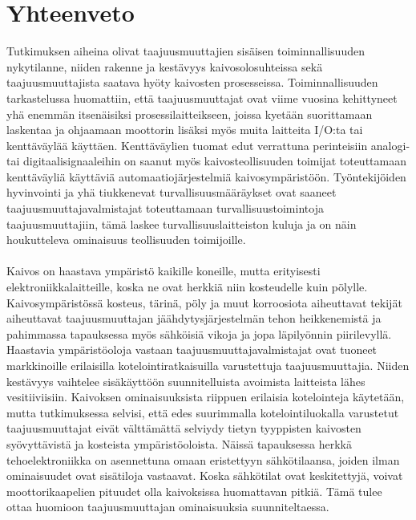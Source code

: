 \documentclass[finnish,12pt,a4paper,pdftex,elec,utf8]{aaltothesis}
\begin{document}
\section{Yhteenveto}
Tutkimuksen aiheina olivat taajuusmuuttajien sisäisen toiminnallisuuden nykytilanne, niiden rakenne ja kestävyys kaivosolosuhteissa sekä taajuusmuuttajista saatava hyöty kaivosten prosesseissa. Toiminnallisuuden tarkastelussa huomattiin, että taajuusmuuttajat ovat viime vuosina kehittyneet yhä enemmän itsenäisiksi prosessilaitteikseen, joissa kyetään suorittamaan laskentaa ja ohjaamaan moottorin lisäksi myös muita laitteita I/O:ta tai kenttäväylää käyttäen. Kenttäväylien tuomat edut verrattuna perinteisiin analogi- tai digitaalisignaaleihin on saanut myös kaivosteollisuuden toimijat toteuttamaan kenttäväyliä käyttäviä automaatiojärjestelmiä kaivosympäristöön. Työntekijöiden hyvinvointi ja yhä tiukkenevat turvallisuusmääräykset ovat saaneet taajuusmuuttajavalmistajat toteuttamaan turvallisuustoimintoja taajuusmuuttajiin, tämä laskee turvallisuuslaitteiston kuluja ja on näin houkutteleva ominaisuus teollisuuden toimijoille.
\\\\
Kaivos on haastava ympäristö kaikille koneille, mutta erityisesti elektroniikkalaitteille, koska ne ovat herkkiä niin kosteudelle kuin pölylle. Kaivosympäristössä kosteus, tärinä, pöly ja muut korroosiota aiheuttavat tekijät aiheuttavat taajuusmuuttajan jäähdytysjärjestelmän tehon heikkenemistä ja pahimmassa tapauksessa myös sähköisiä vikoja ja jopa läpilyönnin piirilevyllä. Haastavia ympäristöoloja vastaan taajuusmuuttajavalmistajat ovat tuoneet markkinoille erilaisilla kotelointiratkaisuilla varustettuja taajuusmuuttajia. Niiden kestävyys vaihtelee sisäkäyttöön suunnitelluista avoimista laitteista lähes vesitiiviisiin. Kaivoksen ominaisuuksista riippuen erilaisia kotelointeja käytetään, mutta tutkimuksessa selvisi, että edes suurimmalla kotelointiluokalla varustetut taajuusmuuttajat eivät välttämättä selviydy tietyn tyyppisten kaivosten syövyttävistä ja kosteista ympäristöoloista. Näissä tapauksessa herkkä tehoelektroniikka on asennettuna omaan eristettyyn sähkötilaansa, joiden ilman ominaisuudet ovat sisätiloja vastaavat. Koska sähkötilat ovat keskitettyjä, voivat moottorikaapelien pituudet olla kaivoksissa huomattavan pitkiä. Tämä tulee ottaa huomioon taajuusmuuttajan ominaisuuksia suunniteltaessa. 
\\\\
\end{document}
